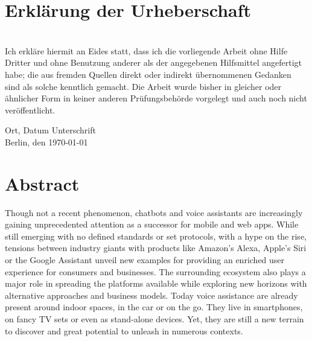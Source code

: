 \chapter*{Erkl{\"a}rung der Urheberschaft}
\\ 
Ich erkläre hiermit an Eides statt, dass ich die vorliegende Arbeit ohne Hilfe Dritter und ohne Benutzung anderer als der angegebenen Hilfsmittel angefertigt habe; die aus fremden Quellen direkt oder indirekt übernommenen Gedanken sind als solche kenntlich gemacht. Die Arbeit wurde bisher in gleicher oder ähnlicher Form in keiner anderen Prüfungsbehörde vorgelegt und auch noch nicht veröffentlicht.


\vspace{4cm}

Ort, Datum \hfill Unterschrift\\
Berlin, den \today


\newpage
\chapter*{Abstract}

Though not a recent phenomenon, chatbots and voice assistants are increasingly gaining unprecedented attention as a successor for mobile and web apps. While still emerging with no defined standards or set protocols, with a hype on the rise, tensions between industry giants with products like Amazon's Alexa, Apple's Siri or the Google Assistant %
unveil new examples for providing an enriched user experience for consumers and businesses. The surrounding ecosystem also plays a major role in spreading the platforms available while exploring new horizons with alternative approaches and business models. Today voice assistance are already present around indoor spaces, in the car or on the go. They live in smartphones, on fancy TV sets or even as stand-alone devices. Yet, they are still a new terrain to discover and great potential to unleash in numerous contexts.\\ 

